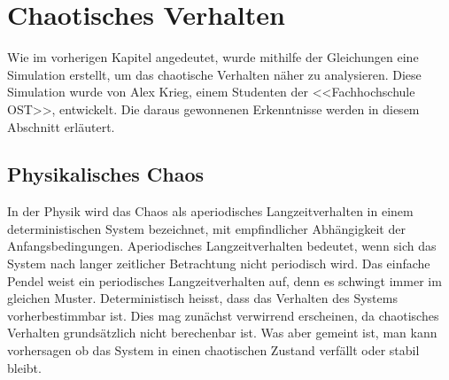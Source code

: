 \section{Chaotisches Verhalten}
Wie im vorherigen Kapitel angedeutet, wurde mithilfe der Gleichungen eine Simulation erstellt,
um das chaotische Verhalten näher zu analysieren.
Diese Simulation wurde von Alex Krieg, einem Studenten der <<Fachhochschule OST>>, entwickelt.
Die daraus gewonnenen Erkenntnisse werden in diesem Abschnitt erläutert.

\subsection{Physikalisches Chaos}
In der Physik wird das Chaos als aperiodisches Langzeitverhalten in einem deterministischen
System bezeichnet, mit empfindlicher Abhängigkeit der Anfangsbedingungen.
Aperiodisches Langzeitverhalten bedeutet, wenn sich das System nach langer zeitlicher Betrachtung
nicht periodisch wird.
Das einfache Pendel weist ein periodisches Langzeitverhalten auf,
denn es schwingt immer im gleichen Muster.
Deterministisch heisst, dass das Verhalten des Systems vorherbestimmbar ist.
Dies mag zunächst verwirrend erscheinen, da chaotisches Verhalten grundsätzlich nicht
berechenbar ist.
Was aber gemeint ist, man kann vorhersagen ob das System in einen chaotischen Zustand 
verfällt oder stabil bleibt.

